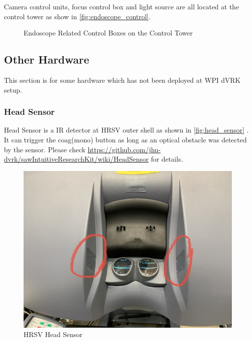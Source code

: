 Camera control units, focus control box and light source are all located at the control tower as show in \autoref{fig:endoscope_control}.

\begin{figure}[H]
\centering
{}
\hfil
{}
\caption{Endoscope Related Control Boxes on the Control Tower}
\label{fig:endoscope_control}
\end{figure}

\subsection{Other Hardware}

This section is for some hardware which has not been deployed at WPI dVRK setup.

\subsubsection{Head Sensor}

Head Sensor is a IR detector at HRSV outer shell as shown in \autoref{fig:head_sensor} . It can trigger the coag(mono) button as long as an optical obstacle was detected by the sensor. Please check \url{https://github.com/jhu-dvrk/sawIntuitiveResearchKit/wiki/HeadSensor} for details.

\begin{figure}[H]
    \centering 
    \includegraphics[width=0.5\linewidth]{figures/head_sensor.jpeg}
    \caption{HRSV Head Sensor}
    \label{fig:head_sensor}
\end{figure}


